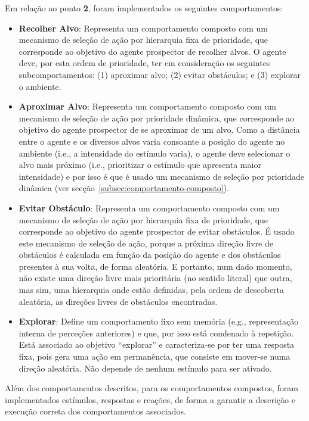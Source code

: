 Em relação ao ponto \textbf{2}, foram implementados os seguintes comportamentos:

\begin{itemize}
    \item \textbf{Recolher Alvo}: Representa um comportamento composto com um mecanismo de seleção de ação por hierarquia fixa de prioridade, que corresponde ao objetivo do agente prospector de recolher alvos.
    O agente deve, por esta ordem de prioridade, ter em consideração os seguintes subcomportamentos: (1) aproximar alvo; (2) evitar obstáculos; e (3) explorar o ambiente.
    \item \textbf{Aproximar Alvo}: Representa um comportamento composto com um mecanismo de seleção de ação por prioridade dinâmica, que corresponde ao objetivo do agente prospector de se aproximar de um alvo.
    Como a distância entre o agente e os diversos alvos varia consoante a posição do agente no ambiente (i.e., a intensidade do estímulo varia), o agente deve selecionar o alvo mais próximo (i.e., prioritizar o estímulo que apresenta maior intensidade) e por isso é que é usado um mecanismo de seleção por prioridade dinâmica (ver secção~\ref{subsec:comportamento-composto}).
    \item \textbf{Evitar Obstáculo}: Representa um comportamento composto com um mecanismo de seleção de ação por hierarquia fixa de prioridade, que corresponde ao objetivo do agente prospector de evitar obstáculos.
    É usado este mecanismo de seleção de ação, porque a próxima direção livre de obstáculos é calculada em função da posição do agente e dos obstáculos presentes à sua volta, de forma aleatória.
    E portanto, num dado momento, não existe uma direção livre mais prioritária (no sentido literal) que outra, mas sim, uma hierarquia onde estão definidas, pela ordem de descoberta aleatória, as direções livres de obstáculos encontradas.
    \item \textbf{Explorar}: Define um comportamento fixo sem memória (e.g., representação interna de perceções anteriores) e que, por isso está condenado à repetição. Está associado ao objetivo ``explorar'' e caracteriza-se por ter uma resposta fixa, pois gera uma ação em permanência, que consiste em mover-se numa direção aleatória. Não depende de nenhum estímulo para ser ativado.
\end{itemize}

Além dos comportamentos descritos, para os comportamentos compostos, foram implementados estímulos, respostas e reações, de forma a garantir a descrição e execução correta dos comportamentos associados.

